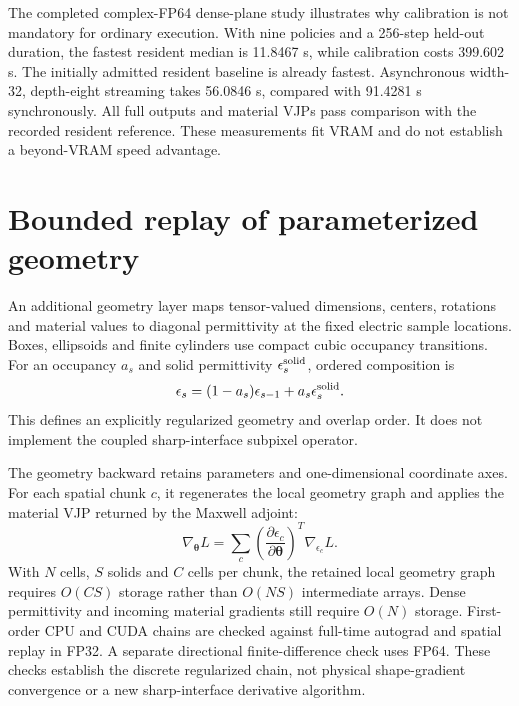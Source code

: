 \documentclass[11pt,a4paper]{article}
\begin{document}
The completed complex-FP64 dense-plane study illustrates why calibration is
not mandatory for ordinary execution. With nine policies and a 256-step
held-out duration, the fastest resident median is 11.8467 s, while calibration
costs 399.602 s. The initially admitted resident baseline is already fastest.
Asynchronous width-32, depth-eight streaming takes 56.0846 s, compared with
91.4281 s synchronously. All full outputs and material VJPs pass comparison
with the recorded resident reference. These measurements fit VRAM and do not
establish a beyond-VRAM speed advantage.

\section{Bounded replay of parameterized geometry}
An additional geometry layer maps tensor-valued dimensions, centers, rotations
and material values to diagonal permittivity at the fixed electric sample
locations. Boxes, ellipsoids and finite cylinders use compact cubic occupancy
transitions. For an occupancy $a_s$ and solid permittivity $\epsilon_s^{\rm solid}$,
ordered composition is
\begin{equation}
\epsilon_s=(1-a_s)\epsilon_{s-1}+a_s\epsilon_s^{\rm solid}.
\end{equation}
This defines an explicitly regularized geometry and overlap order. It does not
implement the coupled sharp-interface subpixel operator.

The geometry backward retains parameters and one-dimensional coordinate axes.
For each spatial chunk $c$, it regenerates the local geometry graph and applies
the material VJP returned by the Maxwell adjoint:
\begin{equation}
\nabla_{\boldsymbol\theta}L=
\sum_c\left(\frac{\partial\epsilon_c}{\partial\boldsymbol\theta}\right)^T
\nabla_{\epsilon_c}L.
\end{equation}
With $N$ cells, $S$ solids and $C$ cells per chunk, the retained local geometry
graph requires $O(CS)$ storage rather than $O(NS)$ intermediate arrays. Dense
permittivity and incoming material gradients still require $O(N)$ storage.
First-order CPU and CUDA chains are checked against full-time autograd and
spatial replay in FP32. A separate directional finite-difference check uses
FP64. These checks establish the discrete regularized chain, not physical
shape-gradient convergence or a new sharp-interface derivative algorithm.
\end{document}
